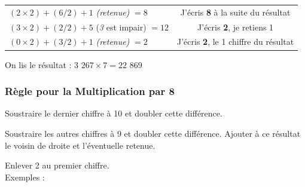 \documentclass[a4paper, twoside]{article}
\begin{document}
\begin{small}
\begin{enumerate}
\begin{tabular}{l|c}
				\tabularnewline
				
				$(2 \times 2) + (6 / 2) + 1$ \textit{(retenue)} $= 8$ & J'écris \textbf{8} à la suite du résultat
				
				\tabularnewline
				
				$(3 \times 2) + (2 / 2) + 5$ (\textit{3} est impair) $= 12$ & J'écris \textbf{2}, je retiens 1
				
				\tabularnewline
				
				$(0 \times 2) + (3 / 2) + 1$ \textit{(retenue)} $= 2$ & J'écris \textbf{2}, le 1\up{er} chiffre du résultat 
				
			\end{tabular}
			
			On lis le résultat : {\boldmath $3$ $267 \times 7 = 22$ $869$}\\

		\end{enumerate}
		\end{small}



		\vfill
		{\noindent \dotfill}



		\subsubsection*{Règle pour la Multiplication par 8}

		Soustraire le dernier chiffre à 10 et doubler cette différence.

		Soustraire les autres chiffres à 9 et doubler cette différence. Ajouter à ce résultat le voisin de droite et l'éventuelle retenue.

		Enlever 2 au premier chiffre.\\

		{ \parindent=0.5cm Exemples : }
\end{document}

